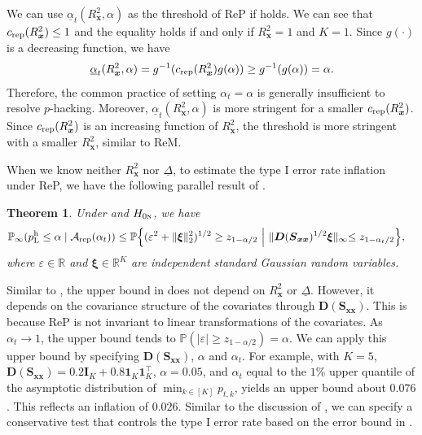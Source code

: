 \documentclass[12pt]{article}
\newtheorem{theorem}{Theorem}
\newcommand{\Prob}{\mathbb{P}}
\newcommand{\ma}{\mathcal{A}}
\newcommand{\rep}{\textnormal{rep}}
\newcommand{\bs}{\boldsymbol}
\newcommand{\hpL}{p_\textnormal{L}^{\textnormal{h}}}
\begin{document}
 We can use $\underline{\alpha}_{t}(R^2_{\bs{x}},\alpha)$ as the threshold of ReP if  holds. We can see that $c_{\rep}(R^2_{\bs{x}}) \leq 1$ and the equality holds if and only if $R^2_{\bs{x}}=1$ and $K=1$. Since $g(\cdot)$ is a decreasing function, we have
 \[
 \underline{\alpha}_{t}(R^2_{\bs{x}},\alpha) = g^{-1}(c_{\rep}(R^2_{\bs{x}})g(\alpha)) \geq g^{-1}(g(\alpha)) = \alpha.  
 \]
 Therefore, the common practice of setting $\alpha_t = \alpha$ is generally insufficient to resolve $p$-hacking. Moreover, $\underline{\alpha}_{t}(R^2_{\bs{x}},\alpha)$ is more stringent for a smaller $c_{\rep}(R^2_{\bs{x}})$.
 Since $c_\rep(R^2_{\bs{x}})$ is an increasing function of $R^2_{\bs{x}}$, the threshold is more stringent with a smaller $R^2_{\bs{x}}$, similar to ReM.


When we know neither $R^2_{\bs{x}}$ nor $\underline{\Delta}$, to estimate the type I error rate inflation under ReP, we have the following parallel result of .

\begin{theorem}
\label{thm:ReP-bound-of-I-error-rate-inflation}
Under  and $H_{0\textsc{n}}$, we have
    \begin{align*}
        &\Prob_{\infty}( \hpL \leq \alpha\mid \ma_{\rep}(\alpha_t))
        \leq  \Prob\Big\{(\varepsilon^{2}+\lVert\bs{\xi}\lVert_2^2)^{1/2} \geq z_{1-\alpha/2}~\Big |~ \lVert\bs{D}(\bs{S}_{\bs{x}\bs{x}})^{1/2} \bs{\xi}\lVert_{\infty} \leq z_{1-\alpha_t/2}\Big\},
    \end{align*}
    where $\varepsilon \in \mathbb{R}$ and $\bs{\xi} \in \mathbb{R}^K$ are independent standard Gaussian random variables.
\end{theorem}

Similar to , the upper bound in  does not depend on $R^2_{\bs{x}}$ or $\underline{\Delta}$. However, it depends on the covariance structure of the covariates through $\bs{D}(\bs{S}_{\bs{x}\bs{x}})$. This is because ReP is not invariant to linear transformations of the covariates. As $\alpha_t\rightarrow 1$, the upper bound tends to $\Prob(|\varepsilon| \geq z_{1-\alpha/2})=\alpha$. We can apply this upper bound by specifying $\bs{D}(\bs{S}_{\bs{x}\bs{x}})$, $\alpha$ and $\alpha_t$. For example, with $K=5$, $\bs{D}(\bs{S}_{\bs{x}\bs{x}}) = 0.2\bs{I}_K + 0.8\bs{1}_K\bs{1}_K^\top$, $\alpha = 0.05$, and $\alpha_t$ equal to the $1\%$ upper quantile of the asymptotic distribution of $\min_{k\in [K]}p_{t,k}$,   yields an upper bound about $0.076$. This reflects an inflation of $0.026$. Similar to the discussion of , we can specify a conservative test that controls the type I error rate based on the error bound in . 
\end{document}
